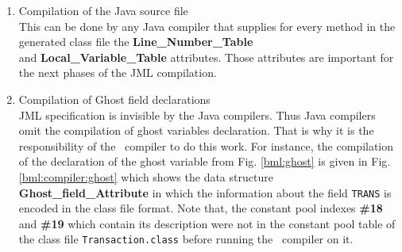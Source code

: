 \begin{enumerate}
\item Compilation of the Java source file \\
  This can be done by any Java compiler that supplies for every method in the generated class file 
  the \textbf{Line\_Number\_Table} \\ 
  and \textbf{Local\_Variable\_Table}  attributes. 
   Those attributes are important for the next phases of the JML compilation.

\item Compilation of Ghost field declarations \\
      JML specification is invisible by the 
      Java compilers. Thus Java compilers omit the compilation of ghost variables declaration.
      That is why it is the responsibility of the \JMLtoBML \  compiler to do this work. 
      For instance, the compilation of the declaration of the ghost variable from
      Fig. \ref{bml:ghost} is given in Fig.\ref{bml:compiler:ghost} which shows the data structure \textbf{Ghost\_field\_Attribute}
      in which the information about the field
      \texttt{TRANS} is encoded in the class file format. 
      Note that,  the constant pool indexes \textbf{\#18} and \textbf{\#19}  which contain its description were not in the constant
      pool table of the class file \texttt{Transaction.class} before running the \JMLtoBML \ compiler on it. 
\begin{figure}[ht!]
\end{figure}
\end{enumerate}
